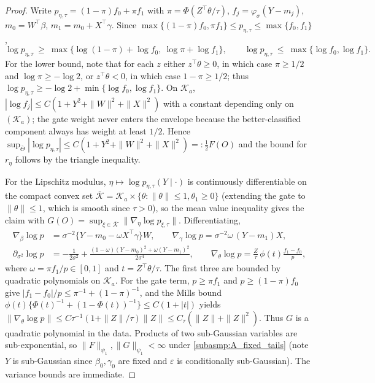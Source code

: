 \documentclass[11pt]{article}
\theoremstyle{definition}
\theoremstyle{plain}
\begin{document}
\begin{proof}
Write $p_{\eta,\tau}=(1-\pi)f_0+\pi f_1$ with $\pi=\Phi(Z^\top\theta/\tau)$, $f_j=\varphi_\sigma(Y-m_j)$, $m_0=W^\top\beta$, $m_1=m_0+X^\top\gamma$. Since $\max\{(1-\pi)f_0,\pi f_1\}\le p_{\eta,\tau}\le\max\{f_0,f_1\}$,
\begin{equation}
\log p_{\eta,\tau}\ \ge\ \max\big\{\log(1-\pi)+\log f_0,\ \log\pi+\log f_1\big\},
\qquad
\log p_{\eta,\tau}\ \le\ \max\{\log f_0,\log f_1\}.
\label{eq:mixture_sandwich}
\end{equation}
For the lower bound, note that for each $z$ either $z^\top\theta\ge0$, in which case $\pi\ge1/2$ and $\log\pi\ge-\log2$, or $z^\top\theta<0$, in which case $1-\pi\ge1/2$; thus
$\log p_{\eta,\tau}\ge-\log2+\min\{\log f_0,\log f_1\}$. On $\mathcal K_a$, $|\log f_j|\le C(1+Y^2+\|W\|^2+\|X\|^2)$ with a constant depending only on $(\mathcal K_a)$; the gate weight never enters the envelope because the better-classified component always has weight at least $1/2$. Hence $\sup_{\bar\Theta}|\log p_{\eta,\tau}|\le C(1+Y^2+\|W\|^2+\|X\|^2)=:\tfrac12F(O)$ and the bound for $r_\eta$ follows by the triangle inequality.

For the Lipschitz modulus, $\eta\mapsto\log p_{\eta,\tau}(Y\mid\cdot)$ is continuously differentiable on the compact convex set $\bar{\mathcal K}=\mathcal K_a\times\{\theta:\|\theta\|\le1,\theta_1\ge0\}$ (extending the gate to $\|\theta\|\le1$, which is smooth since $\tau>0$), so the mean value inequality gives the claim with
$G(O)=\sup_{\xi\in\bar{\mathcal K}}\|\nabla_\eta\log p_{\xi,\tau}\|$. Differentiating,
\begin{align*}
\nabla_\beta\log p&=\sigma^{-2}\{Y-m_0-\omega X^\top\gamma\}W,\qquad
\nabla_\gamma\log p=\sigma^{-2}\omega\,(Y-m_1)X,\\
\partial_{\sigma^2}\log p&=-\tfrac{1}{2\sigma^2}+\tfrac{(1-\omega)(Y-m_0)^2+\omega(Y-m_1)^2}{2\sigma^4},\qquad
\nabla_\theta\log p=\tfrac{Z}{\tau}\,\phi(t)\tfrac{f_1-f_0}{p},
\end{align*}
where $\omega=\pi f_1/p\in[0,1]$ and $t=Z^\top\theta/\tau$. The first three are bounded by quadratic polynomials on $\mathcal K_a$. For the gate term, $p\ge\pi f_1$ and $p\ge(1-\pi)f_0$ give $|f_1-f_0|/p\le\pi^{-1}+(1-\pi)^{-1}$, and the Mills bound $\phi(t)\{\Phi(t)^{-1}+(1-\Phi(t))^{-1}\}\le C(1+|t|)$ yields
$\|\nabla_\theta\log p\|\le C\tau^{-1}(1+\|Z\|/\tau)\|Z\|\le C_\tau(\|Z\|+\|Z\|^2)$.
Thus $G$ is a quadratic polynomial in the data. Products of two sub-Gaussian variables are sub-exponential, so $\|F\|_{\psi_1},\|G\|_{\psi_1}<\infty$ under \ref{subasmp:A_fixed_tails} (note $Y$ is sub-Gaussian since $\beta_0,\gamma_0$ are fixed and $\varepsilon$ is conditionally sub-Gaussian). The variance bounds are immediate.
\end{proof}
\end{document}
